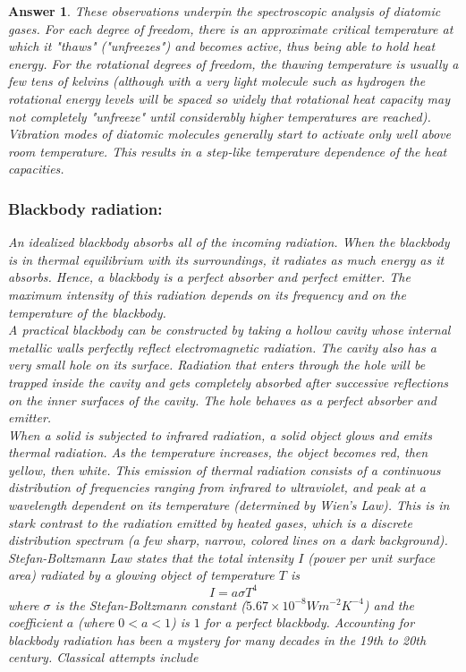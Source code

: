 \documentclass[a4paper]{article}
\newtheorem{ans}{Answer}[subsection]
\theoremstyle{new}
\begin{document}
\begin{ans}
These observations underpin the spectroscopic analysis
of diatomic gases. For each degree of freedom, there is an approximate critical temperature at which it "thaws" ("unfreezes") and becomes active, thus being able to hold heat energy. For the rotational degrees of freedom, the thawing temperature is usually a few tens of kelvins (although with a very light molecule such as hydrogen the rotational energy levels will be spaced so widely that rotational heat capacity may not completely "unfreeze" until considerably higher temperatures are reached). Vibration modes of diatomic molecules generally start to activate only well above room temperature. This results in a step-like temperature dependence of the heat capacities.
\newpage
\subsubsection*{Blackbody radiation:}
An idealized blackbody absorbs all of the incoming radiation. When the blackbody is in thermal equilibrium with its surroundings, it radiates as much energy as it absorbs. Hence, a blackbody is a perfect absorber and perfect emitter. The maximum intensity of this radiation depends on its frequency and on the temperature of the blackbody.\\[5pt]
A practical blackbody can be constructed by taking a hollow cavity whose internal metallic walls perfectly reflect electromagnetic radiation. The cavity also has a very small hole on its surface. Radiation that enters through the hole will be trapped inside the cavity and gets completely absorbed after successive reflections on the inner surfaces of the cavity. The hole behaves as a perfect absorber and emitter.\\[5pt]
When a solid is subjected to infrared radiation, a solid object glows and emits thermal radiation. As the temperature increases, the object becomes red, then yellow, then white. This emission of thermal radiation consists of a continuous distribution of frequencies ranging from infrared to ultraviolet, and peak at a wavelength dependent on its temperature (determined by Wien's Law). This is in stark contrast to the radiation emitted by heated gases, which is a discrete distribution spectrum (a few sharp, narrow, colored lines on a dark background). Stefan-Boltzmann Law states that the total intensity $I$ (power per unit surface area) radiated by a glowing object of temperature $T$ is
$$I=a\sigma T^4$$
where $\sigma$ is the Stefan-Boltzmann constant ($5.67\times10^{-8}Wm^{-2}K^{-4}$) and the coefficient $a$ (where $0<a<1$) is $1$ for a perfect blackbody. Accounting for blackbody radiation has been a mystery for many decades in the 19th to 20th century. Classical attempts include

\end{ans}
\end{document}
